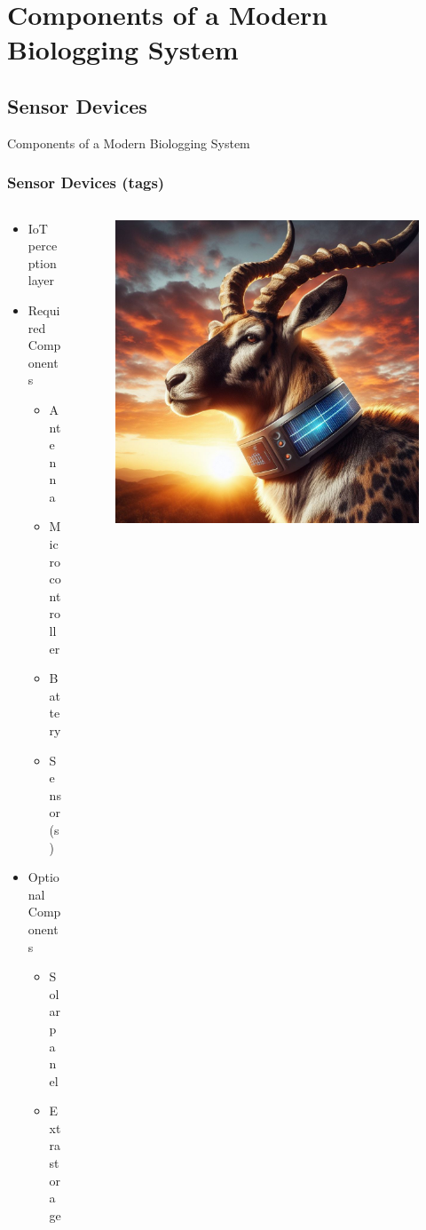 \documentclass{beamer}
\begin{document}
\section{Components of a Modern Biologging System}

\subsection{Sensor Devices}

  \begin{frame}{Components of a Modern Biologging System}
    \frametitle{Sensor Devices (tags)}
    \begin{columns}
      \begin{column}{.5\textwidth}
        \begin{itemize}
          \item IoT perception layer 
          \item Required Components
          \begin{itemize}
            \item Antenna
            \item Microcontroller
            \item Battery
            \item Sensor(s)
          \end{itemize}
          \item Optional Components
          \begin{itemize}
            \item Solar panel
            \item Extra storage
          \end{itemize}
        \end{itemize}
      \end{column}
      \begin{column}{0.5\textwidth}
        \begin{figure}[htbp]
          \centering
          \includegraphics[height=.6\textheight]{Solar_collar.jpg}

\end{figure}
\end{column}
\end{columns}
\end{frame}
\end{document}
